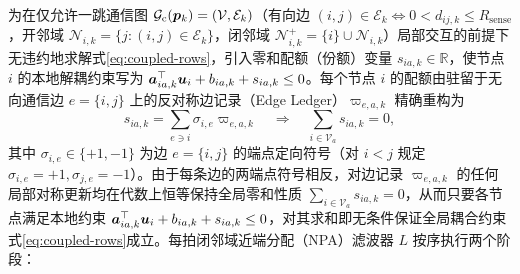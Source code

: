 为在仅允许一跳通信图 $\mathcal G_{\mathrm c}(\boldsymbol{p}_k)=(\mathcal V,\mathcal E_k)$（有向边 $(i,j)\in\mathcal E_k\Longleftrightarrow 0<d_{ij,k}\le R_{\mathrm{sense}}$，开邻域 $\mathcal N_{i,k}=\{j:(i,j)\in\mathcal E_k\}$，闭邻域 $\mathcal N_{i,k}^+=\{i\}\cup\mathcal N_{i,k}$）局部交互的前提下无违约地求解式\eqref{eq:coupled-rows}，引入零和配额（份额）变量 $s_{ia,k}\in\mathbb R$，使节点 $i$ 的本地解耦约束写为 $\boldsymbol a_{ia,k}^{\top}\boldsymbol{u}_i+b_{ia,k}+s_{ia,k}\le 0$。每个节点 $i$ 的配额由驻留于无向通信边 $e=\{i,j\}$ 上的反对称边记录（Edge Ledger）$\varpi_{e,a,k}$ 精确重构为
\begin{equation}
 s_{ia,k}=\sum_{e\ni i}\sigma_{i,e}\varpi_{e,a,k}\quad\Longrightarrow\quad \sum_{i\in\mathcal V_a}s_{ia,k}=0,
 \label{eq:edge-ledger}
\end{equation}
其中 $\sigma_{i,e}\in\{+1,-1\}$ 为边 $e=\{i,j\}$ 的端点定向符号（对 $i<j$ 规定 $\sigma_{i,e}=+1,\sigma_{j,e}=-1$）。由于每条边的两端点符号相反，对边记录 $\varpi_{e,a,k}$ 的任何局部对称更新均在代数上恒等保持全局零和性质 $\sum_{i\in\mathcal V_a}s_{ia,k}=0$，从而只要各节点满足本地约束 $\boldsymbol a_{ia,k}^{\top}\boldsymbol{u}_i+b_{ia,k}+s_{ia,k}\le 0$，对其求和即无条件保证全局耦合约束式\eqref{eq:coupled-rows}成立。每拍闭邻域近端分配（NPA）滤波器 $L$ 按序执行两个阶段：
